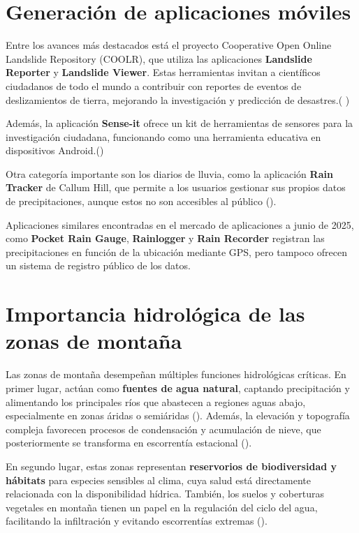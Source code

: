 \section{Generación de aplicaciones móviles}

Entre los avances más destacados está el proyecto Cooperative Open Online Landslide Repository (COOLR), que utiliza las aplicaciones \textbf{Landslide Reporter} y \textbf{Landslide Viewer}. Estas herramientas invitan a científicos ciudadanos de todo el mundo a contribuir con reportes de eventos de deslizamientos de tierra, mejorando la investigación y predicción de desastres.(\cite{coolr2021} )

Además, la aplicación \textbf{Sense-it} ofrece un kit de herramientas de sensores para la investigación ciudadana, funcionando como una herramienta educativa en dispositivos Android.(\cite{van2017senseit})


Otra categoría importante son los diarios de lluvia, como la aplicación \textbf{Rain Tracker} de Callum Hill, que permite a los usuarios gestionar sus propios datos de precipitaciones, aunque estos no son accesibles al público  (\cite{hill2021raintracker}).

Aplicaciones similares encontradas en el mercado de aplicaciones a junio de 2025, como \textbf{Pocket Rain Gauge}, \textbf{Rainlogger} y \textbf{Rain Recorder} registran las precipitaciones en función de la ubicación mediante GPS, pero tampoco ofrecen un sistema de registro público de los datos.








\section{Importancia hidrológica de las zonas de montaña}



Las zonas de montaña desempeñan múltiples funciones hidrológicas críticas. En primer lugar, actúan como \textbf{fuentes de agua natural}, captando precipitación y alimentando los principales ríos que abastecen a regiones aguas abajo, especialmente en zonas áridas o semiáridas  (\cite{viviroli2007mountain}). Además, la elevación y topografía compleja favorecen procesos de condensación y acumulación de nieve, que posteriormente se transforma en escorrentía estacional  (\cite{immerzeel2020importance}). 

En segundo lugar, estas zonas representan \textbf{reservorios de biodiversidad y hábitats} para especies sensibles al clima, cuya salud está directamente relacionada con la disponibilidad hídrica. También, los suelos y coberturas vegetales en montaña tienen un papel en la regulación del ciclo del agua, facilitando la infiltración y evitando escorrentías extremas  (\cite{buytaert2011mountain}).

